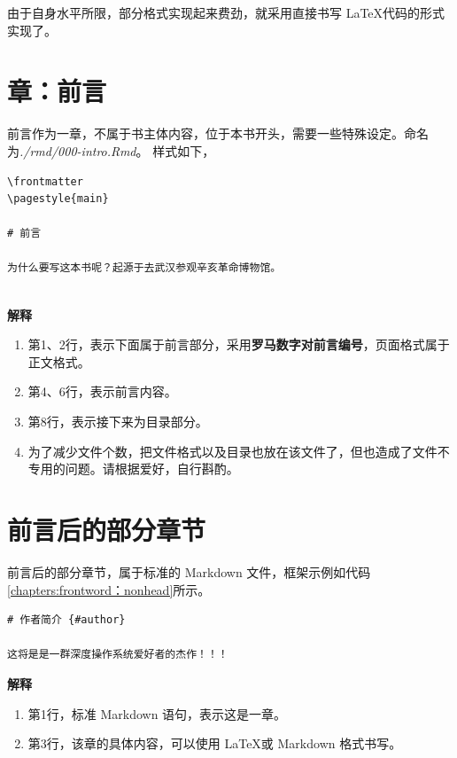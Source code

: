 \documentclass[doctor,openright,twoside]{sjtuthesis}
\providecommand{\tightlist}{%
    \setlength{\itemsep}{0pt}\setlength{\parskip}{0pt}}
\theoremstyle{plain}
\theoremstyle{definition}
\theoremstyle{remark}
\theoremstyle{ocrenumbox}
\theoremstyle{plain}
\begin{document}
由于自身水平所限，部分格式实现起来费劲，就采用直接书写
\LaTeX 代码的形式实现了。

\section{章：前言}

前言作为一章，不属于书主体内容，位于本书开头，需要一些特殊设定。命名为\emph{./rmd/000-intro.Rmd}。
样式如下，

\begin{lstlisting}[caption=前言示例, label={chapters:intro}]
\frontmatter
\pagestyle{main}

# 前言

为什么要写这本书呢？起源于去武汉参观辛亥革命博物馆。


\end{lstlisting}

\textbf{解释}

\begin{enumerate}
\def\labelenumi{\arabic{enumi}.}
\tightlist
\item
  第1、2行，表示下面属于前言部分，采用\textbf{罗马数字对前言编号}，页面格式属于正文格式。
\item
  第4、6行，表示前言内容。
\item
  第8行，表示接下来为目录部分。
\item
  为了减少文件个数，把文件格式以及目录也放在该文件了，但也造成了文件不专用的问题。请根据爱好，自行斟酌。
\end{enumerate}

\section{前言后的部分章节}

前言后的部分章节，属于标准的 Markdown
文件，框架示例如代码\ref{chapters:frontword：nonhead}所示。

\begin{lstlisting}[caption=前言后文示例, label={chapters:frontword：nonhead}]
# 作者简介 {#author}

这将是是一群深度操作系统爱好者的杰作！！！
\end{lstlisting}

\textbf{解释}

\begin{enumerate}
\def\labelenumi{\arabic{enumi}.}
\tightlist
\item
  第1行，标准 Markdown 语句，表示这是一章。
\item
  第3行，该章的具体内容，可以使用 \LaTeX 或 Markdown 格式书写。
\end{enumerate}
\end{document}

